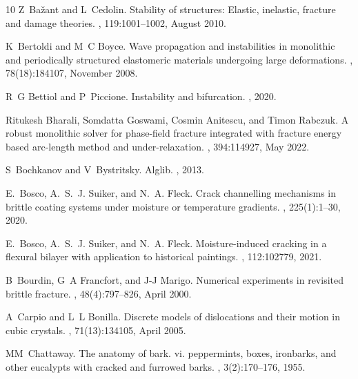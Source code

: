 \documentclass[10pt]{article}
\begin{document}
\begin{thebibliography}{10}
    Z~Ba{\v z}ant and L~Cedolin.
    \newblock Stability of structures: Elastic, inelastic, fracture and damage theories.
    , 119:1001--1002, August 2010.

    K~Bertoldi and M~C Boyce.
    \newblock Wave propagation and instabilities in monolithic and periodically structured elastomeric materials undergoing large deformations.
    , 78(18):184107, November 2008.

    R~G Bettiol and P~Piccione.
    \newblock Instability and bifurcation.
    , 2020.

    Ritukesh Bharali, Somdatta Goswami, Cosmin Anitescu, and Timon Rabczuk.
    \newblock A robust monolithic solver for phase-field fracture integrated with fracture energy based arc-length method and under-relaxation.
    , 394:114927, May 2022.

    S~Bochkanov and V~Bystritsky.
    \newblock Alglib.
    , 2013.

    E.~Bosco, A.~S.~J. Suiker, and N.~A. Fleck.
    \newblock Crack channelling mechanisms in brittle coating systems under moisture or temperature gradients.
    , 225(1):1--30, 2020.

    E.~Bosco, A.~S.~J. Suiker, and N.~A. Fleck.
    \newblock Moisture-induced cracking in a flexural bilayer with application to historical paintings.
    , 112:102779, 2021.

    B~Bourdin, G~A Francfort, and J-J Marigo.
    \newblock Numerical experiments in revisited brittle fracture.
    , 48(4):797--826, April 2000.

    A~Carpio and L~L Bonilla.
    \newblock Discrete models of dislocations and their motion in cubic crystals.
    , 71(13):134105, April 2005.

    MM~Chattaway.
    \newblock The anatomy of bark. vi. peppermints, boxes, ironbarks, and other eucalypts with cracked and furrowed barks.
    , 3(2):170--176, 1955.


\end{thebibliography}
\end{document}
